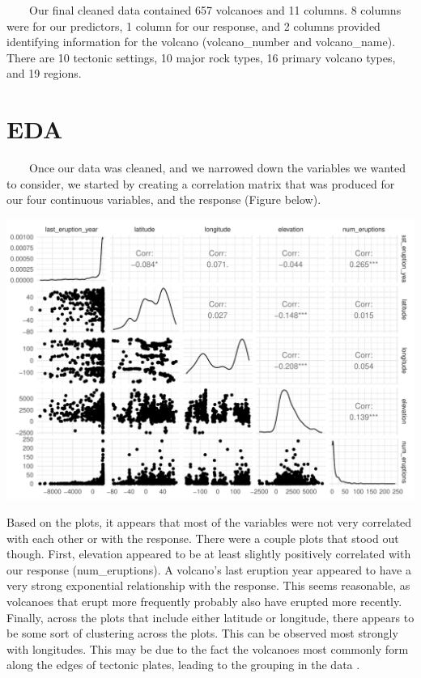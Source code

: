 \documentclass[
  12pt,
]{article}
\begin{document}
~~~~Our final cleaned data contained 657 volcanoes and 11 columns. 8
columns were for our predictors, 1 column for our response, and 2
columns provided identifying information for the volcano
(volcano\_number and volcano\_name). There are 10 tectonic settings, 10
major rock types, 16 primary volcano types, and 19 regions.

\section{EDA}\label{eda}

~~~~Once our data was cleaned, and we narrowed down the variables we
wanted to consider, we started by creating a correlation matrix that was
produced for our four continuous variables, and the response (Figure
below).

\begin{center}\includegraphics{Report_files/figure-latex/correlation-matrix-1} \end{center}

Based on the plots, it appears that most of the variables were not very
correlated with each other or with the response. There were a couple
plots that stood out though. First, elevation appeared to be at least
slightly positively correlated with our response (num\_eruptions). A
volcano's last eruption year appeared to have a very strong exponential
relationship with the response. This seems reasonable, as volcanoes that
erupt more frequently probably also have erupted more recently. Finally,
across the plots that include either latitude or longitude, there
appears to be some sort of clustering across the plots. This can be
observed most strongly with longitudes. This may be due to the fact the
volcanoes most commonly form along the edges of tectonic plates, leading
to the grouping in the data \citep{nps2022}.
\end{document}
